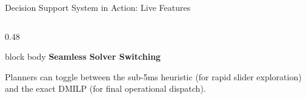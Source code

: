 \documentclass[aspectratio=169,10pt]{beamer}
\begin{document}
\begin{frame}{Decision Support System in Action: Live Features}
\begin{columns}[T,totalwidth=\textwidth]
\begin{column}{0.48\textwidth}
        \vspace{0.15cm}
        \begin{beamercolorbox}[rounded=true,shadow=false,wd=\linewidth,sep=4pt]{block body}
            {\bfseries\color{Accent}\scriptsize Seamless Solver Switching}\par\vspace{0.02cm}
            \tiny
            Planners can toggle between the sub-5ms heuristic (for rapid slider exploration) and the exact DMILP (for final operational dispatch).
        \end{beamercolorbox}
    \end{column}
\end{columns}

\vfill
\end{frame}

\end{document}
